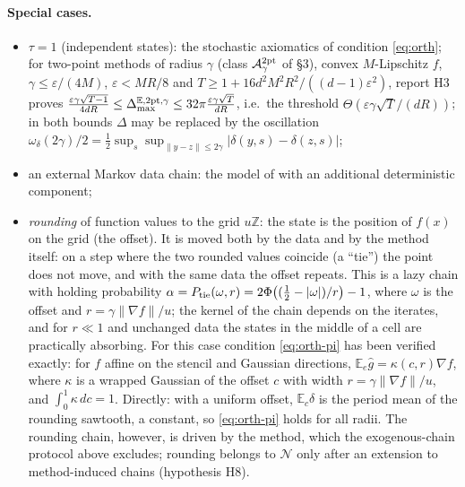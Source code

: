 \documentclass[10pt,a4paper]{article}
\newcommand{\E}{\mathbb E}\newcommand{\R}{\mathbb R}
\newcommand{\norm}[1]{\lVert #1\rVert}\newcommand{\abs}[1]{\lvert #1\rvert}
\newcommand{\Dmax}{\Delta_{\max}}
\theoremstyle{definition}\newtheorem{definition}{Definition}
\begin{document}
\paragraph{Special cases.}
\begin{itemize}
\item $\tau=1$ (independent states): the stochastic axiomatics of condition \eqref{eq:orth}; for two-point methods of radius $\gamma$ (class $\mathcal A^{2\rm pt}_\gamma$ of \S3), convex $M$-Lipschitz $f$, $\gamma\le\varepsilon/(4M)$, $\varepsilon<MR/8$ and $T\ge1+16d^2M^2R^2/((d-1)\varepsilon^2)$, report H3 proves $\frac{\varepsilon\gamma\sqrt{T-1}}{4dR}\le\Dmax^{\E,2\rm pt,\gamma}\le32\pi\frac{\varepsilon\gamma\sqrt T}{dR}$, i.e.\ the threshold $\Theta(\varepsilon\gamma\sqrt T/(dR))$; in both bounds $\Delta$ may be replaced by the oscillation $\omega_\delta(2\gamma)/2=\frac12\sup_s\sup_{\norm{y-z}\le2\gamma}\abs{\delta(y,s)-\delta(z,s)}$;
\item an external Markov data chain: the model of \cite{prokhorov} with an additional deterministic component;
\item \emph{rounding} of function values to the grid $u\mathbb Z$: the state is the position of $f(x)$ on the grid (the offset). It is moved both by the data and by the method itself: on a step where the two rounded values coincide (a ``tie'') the point does not move, and with the same data the offset repeats. This is a lazy chain with holding probability $\alpha=P_{\rm tie}(\omega,r)=2\Phi\big((\tfrac12-\abs\omega)/r\big)-1$, where $\omega$ is the offset and $r=\gamma\norm{\nabla f}/u$; the kernel of the chain depends on the iterates, and for $r\ll1$ and unchanged data the states in the middle of a cell are practically absorbing. For this case condition \eqref{eq:orth-pi} has been verified exactly: for $f$ affine on the stencil and Gaussian directions, $\E_e\hat g=\kappa(c,r)\nabla f$, where $\kappa$ is a wrapped Gaussian of the offset $c$ with width $r=\gamma\norm{\nabla f}/u$, and $\int_0^1\kappa\,dc=1$. Directly: with a uniform offset, $\E_c\delta$ is the period mean of the rounding sawtooth, a constant, so \eqref{eq:orth-pi} holds for all radii. The rounding chain, however, is driven by the method, which the exogenous-chain protocol above excludes; rounding belongs to $\mathcal N$ only after an extension to method-induced chains (hypothesis H8).
\end{itemize}
\end{document}
